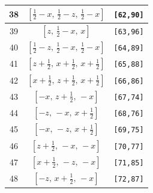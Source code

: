 \documentclass[fleqn,8pt]{jsarticle}
\begin{document}
\begin{longtable}{ccc}
38 & $\left[ \frac{1}{2} - x,\, \frac{1}{2} - z,\, \frac{1}{2} - x \right]$ & {\tt [62,90]} \\ \hline
39 & $\left[ z,\, \frac{1}{2} - x,\, x \right]$ & {\tt [63,96]} \\ \hline
40 & $\left[ \frac{1}{2} - z,\, \frac{1}{2} - x,\, \frac{1}{2} - x \right]$ & {\tt [64,89]} \\ \hline
41 & $\left[ z + \frac{1}{2},\, x + \frac{1}{2},\, x + \frac{1}{2} \right]$ & {\tt [65,88]} \\ \hline
42 & $\left[ x + \frac{1}{2},\, z + \frac{1}{2},\, x + \frac{1}{2} \right]$ & {\tt [66,86]} \\ \hline
43 & $\left[ - x,\, z + \frac{1}{2},\, - x \right]$ & {\tt [67,74]} \\ \hline
44 & $\left[ - z,\, - x,\, x + \frac{1}{2} \right]$ & {\tt [68,76]} \\ \hline
45 & $\left[ - x,\, - z,\, x + \frac{1}{2} \right]$ & {\tt [69,75]} \\ \hline
46 & $\left[ z + \frac{1}{2},\, - x,\, - x \right]$ & {\tt [70,77]} \\ \hline
47 & $\left[ x + \frac{1}{2},\, - z,\, - x \right]$ & {\tt [71,85]} \\ \hline
48 & $\left[ - z,\, x + \frac{1}{2},\, - x \right]$ & {\tt [72,87]} \\
\end{longtable}
\renewcommand{\arraystretch}{1.2}
\end{document}
